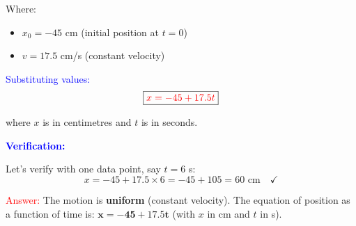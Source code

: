 \begin{exercise}
\begin{solu}
        Where:
        \begin{itemize}
            \item $x_0 = -45$ cm (initial position at $t = 0$)
            \item $v = 17.5$ cm/s (constant velocity)
        \end{itemize}

        \textcolor{blue}{Substituting values:}
        \[
            \boxed{\textcolor{red}{x = -45 + 17.5t}}
        \]

        where $x$ is in centimetres and $t$ is in seconds.

        \vspace{0.3cm}

        \textbf{\textcolor{blue}{Verification:}}

        Let's verify with one data point, say $t = 6$ s:
        \[
            x = -45 + 17.5 \times 6 = -45 + 105 = 60 \text{ cm} \quad \checkmark
        \]

        \textcolor{red}{Answer:} The motion is \textbf{uniform} (constant velocity). The equation of position as a function of time is: $\mathbf{x = -45 + 17.5t}$ (with $x$ in cm and $t$ in s).
    \end{solu}
\end{exercise}





